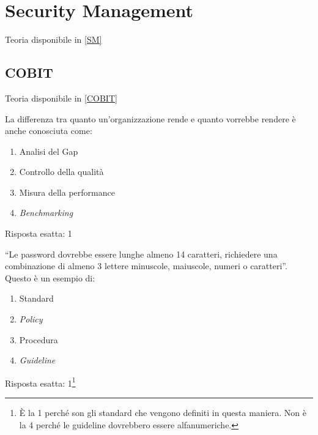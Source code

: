 \chapter{Security Management}
\label{esSM}

Teoria disponibile in \ref{SM}

\section{COBIT}
\label{esSM:COBIT}

Teoria disponibile in \ref{COBIT}

\begin{Exercise} [
  title={Quiz},
  label={esSM1}
  ]

  \Question La differenza tra quanto un'organizzazione rende e quanto 
  vorrebbe rendere è anche conosciuta come:
\begin{enumerate}
 \item Analisi del Gap
 \item Controllo della qualità
 \item Misura della performance
 \item \textit{Benchmarking}
\end{enumerate}

\end{Exercise}

\begin{Answer} [
  ref={esSM1},
  number={1}
  ]

  \Question Risposta esatta: 1
\end{Answer}


\begin{Exercise} [
  title={Quiz},
  label={esSM2}
  ]

  \Question ``Le password dovrebbe essere lunghe almeno 14 caratteri, 
richiedere una combinazione di almeno 3 lettere minuscole, maiuscole, numeri o 
caratteri''. Questo è un esempio di:
\begin{enumerate}
 \item Standard
 \item \textit{Policy}
 \item Procedura
 \item \textit{Guideline}
\end{enumerate}

\end{Exercise}

\begin{Answer} [
  ref={esSM2},
  number={2}
  ]

  \Question Risposta esatta: 1\footnote{È la 1 perché son gli standard che 
vengono definiti in questa maniera. Non è la 4 perché le guideline dovrebbero 
essere alfanumeriche.}
\end{Answer}


